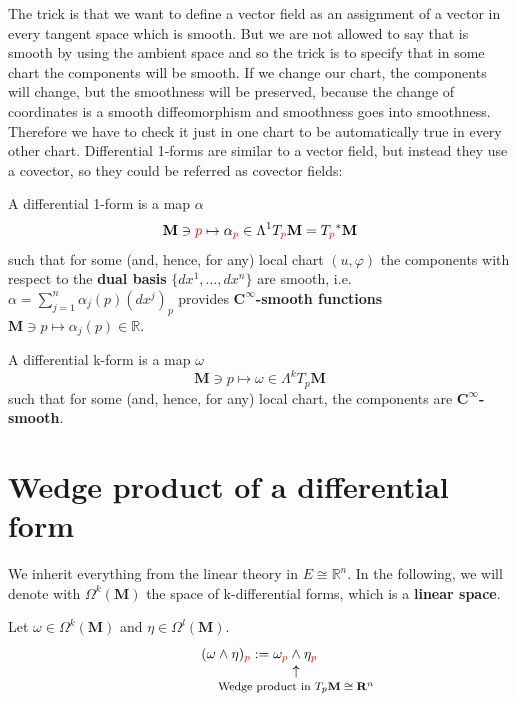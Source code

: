 \documentclass[../main.tex]{subfiles}
\begin{document}
The trick is that we want to define a vector field as an assignment of a vector in every tangent space which is smooth. But we are not allowed to say that is smooth by using the ambient space and so the trick is to specify that in some chart the components will be smooth. If we change our chart, the components will change, but the smoothness will be preserved, because the change of coordinates is a smooth diffeomorphism and smoothness goes into smoothness. Therefore we have to check it just in one chart to be automatically true in every other chart. Differential 1-forms are similar to a vector field, but instead they use a covector, so they could be referred as covector fields:
\begin{definition}
A differential 1-form is a map $\alpha$
\[
\mathbf{M}\ni{\color{red}p}\mapsto \alpha_{\color{red}p}\in\Lambda^1 T_{\color{red}p}\mathbf{M}=T_{\color{red}p}^*\mathbf{M}\]
such that for some (and, hence, for any) local chart $(u,\varphi)$ the components with respect to the \textbf{dual basis} $\{dx^1,\dots,dx^n\}$ are smooth, i.e. $\alpha=\sum_{j=1}^n\alpha_j(p)(dx^j)_p$ provides $\mathbf{C^{\infty}}$\textbf{-smooth functions} $\mathbf{M}\ni p \mapsto \alpha_j(p)\in\mathbb{R}$.
\end{definition}

\begin{definition}
A differential k-form is a map $\omega$ \[\mathbf{M}\ni p\mapsto\omega\in\Lambda^k T_p\mathbf{M}\] such that for some (and, hence, for any) local chart, the components are $\mathbf{C^{\infty}}$\textbf{-smooth}.
\end{definition}

\section{Wedge product of a differential form}
We inherit everything from the linear theory in $E\cong\mathbb{R}^n$. In the following, we will denote with $\Omega^k(\mathbf{M})$ the space of k-differential forms, which is a \textbf{linear space}.

\begin{definition}
Let $\omega\in\Omega^k(\mathbf{M})$ and $\eta\in\Omega^l(\mathbf{M})$.
\[
(\omega\wedge\eta)_{\color{red}p}:=\omega_{\color{red}p}\underset{\mathclap{\tikz \node {$\uparrow$} node [below=1ex] {\footnotesize Wedge product in $T_p\mathbf{M}\cong\mathbf{R}^n$ };}}\wedge\eta_{\color{red}p}
\]
\end{definition}
\end{document}
